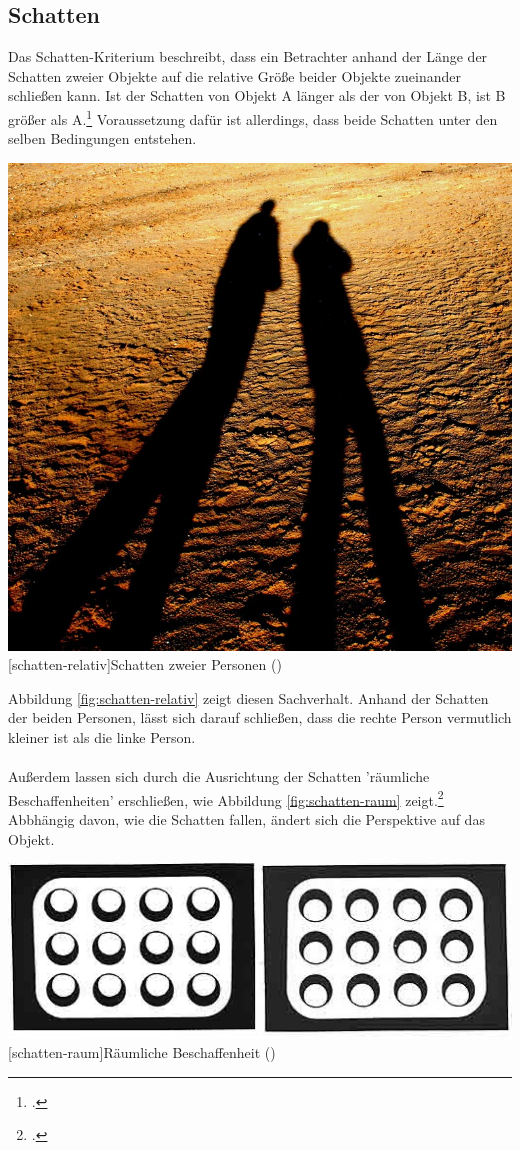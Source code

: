 \subsection{Schatten}
Das Schatten-Kriterium beschreibt, dass ein Betrachter anhand der Länge der Schatten zweier Objekte auf die relative Größe beider Objekte zueinander schließen kann. Ist der Schatten von Objekt A länger als der von Objekt B, ist B größer als A.\footcite[Vgl.][S.43]{Gras16} Voraussetzung dafür ist allerdings, dass beide Schatten unter den selben Bedingungen entstehen.\\

\vspace{1em}
\begin{minipage}{\linewidth}
	\centering
	\includegraphics[width=0.7\linewidth]{images/schatten_personen.jpg}
	[schatten-relativ]{Schatten zweier Personen (\cite{PixaXX})}
	\label{fig:schatten-relativ}
\end{minipage}
\vspace{1em} 

Abbildung \ref{fig:schatten-relativ} zeigt diesen Sachverhalt. Anhand der Schatten der beiden Personen, lässt sich darauf schließen, dass die rechte Person vermutlich kleiner ist als die linke Person.\\
\\
Außerdem lassen sich durch die Ausrichtung der Schatten  'räumliche Beschaffenheiten' erschließen, wie Abbildung \ref{fig:schatten-raum} zeigt.\footcite[Vgl.]{heidXX} Abbhängig davon, wie die Schatten fallen, ändert sich die Perspektive auf das Objekt.

\vspace{1em}
\begin{minipage}{\linewidth}
	\centering
	\includegraphics[width=0.7\linewidth]{images/schatten01.jpg}
	[schatten-raum]{Räumliche Beschaffenheit (\cite{heidXX})}
	\label{fig:schatten-raum}
\end{minipage}
\vspace{1em} 

